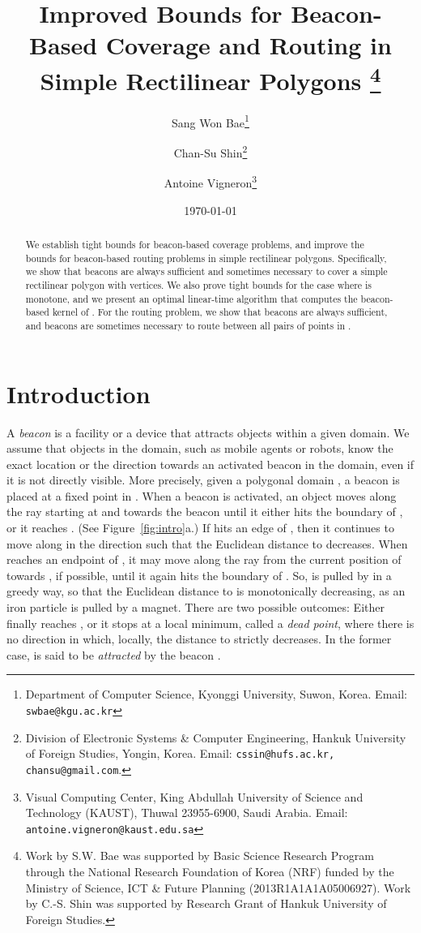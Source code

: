 \documentclass[11pt]{article}
\title{Improved Bounds for Beacon-Based Coverage and Routing in Simple Rectilinear Polygons
\thanks{Work by S.W. Bae was supported by Basic Science Research Program through the National
Research Foundation of Korea (NRF) funded by the Ministry of Science, ICT \& Future Planning
(2013R1A1A1A05006927).
Work by C.-S. Shin was supported by Research Grant of Hankuk University of Foreign Studies.
}
}
\author{Sang Won Bae\footnote{Department of Computer Science, Kyonggi University, Suwon, Korea.
Email: \texttt{swbae@kgu.ac.kr}
}
\and Chan-Su Shin\footnote{Division of Electronic Systems \& Computer Engineering,
Hankuk University of Foreign
Studies, Yongin, Korea.
Email: \texttt{cssin@hufs.ac.kr, chansu@gmail.com}.
}
\and Antoine Vigneron\footnote{Visual Computing Center,
King Abdullah University of Science and	Technology (KAUST), Thuwal 23955-6900, Saudi Arabia.
Email: \texttt{antoine.vigneron@kaust.edu.sa}
}
}
\date{\today
}
\theoremstyle{definition}
\begin{document}
\maketitle



\begin{abstract}
We establish tight bounds for beacon-based coverage problems, and improve the bounds for beacon-based routing problems in simple rectilinear polygons. 
Specifically, we show that  beacons are always sufficient and sometimes necessary to cover a simple rectilinear polygon  with  vertices. 
 We also prove tight bounds for the case where  is monotone,
and we present an optimal linear-time algorithm that computes the beacon-based kernel
of .
For the routing problem, we show that  beacons
are always sufficient, and  beacons are sometimes necessary to route between all pairs of points in .
\end{abstract}


\section{Introduction} \label{sec:intro}


A \emph{beacon} is a facility or a device that attracts objects within a given domain.
We assume that objects in the domain, such as mobile agents or robots, know the exact location
or the direction towards an activated beacon in the domain, even if it is not directly visible.
More precisely, given a polygonal domain , a beacon is placed at a fixed point in .
When a beacon  is activated, an object  moves along the ray
starting at   and towards the beacon  until it either  hits the boundary  of ,
or it reaches . (See Figure~\ref{fig:intro}a.)
If  hits an edge  of , then it continues to move along  in the direction such
that the Euclidean distance to  decreases.
When  reaches an endpoint of , it may move along the ray from the current
position of  towards , if possible, until it again hits the boundary  of .
So,  is pulled by  in a greedy way, so that the Euclidean distance to 
is monotonically decreasing, as an iron particle is pulled by a magnet.
There are two possible outcomes: Either  finally reaches , or it stops at a local minimum,
called a \emph{dead point}, where there is no direction in which, locally, the distance to  
strictly decreases. In the former case,  is said to be \emph{attracted} by the beacon . 
\end{document}
